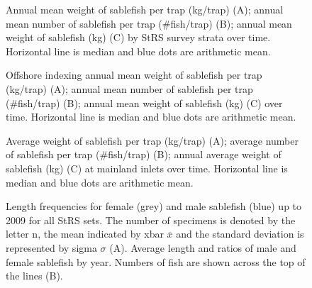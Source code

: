 \documentclass[12pt]{article}\usepackage[]{graphicx}\usepackage[]{color}
\begin{document}
\begin{figure}[htb]

{\centering {} 

}

\caption{Annual mean weight of sablefish per trap (kg/trap) (A); annual mean number of sablefish per trap (\#fish/trap) (B); annual mean weight of sablefish (kg) (C) by StRS survey strata over time. Horizontal line is median and blue dots are arithmetic mean.}\label{fig:figure10}
\end{figure}
\clearpage


\begin{figure}[htb]

{\centering {} 

}

\caption{Offshore indexing annual mean weight of sablefish per trap (kg/trap) (A); annual mean number of sablefish per trap (\#fish/trap) (B); annual mean weight of sablefish (kg) (C) over time. Horizontal line is median and blue dots are arithmetic mean.}\label{fig:figure11}
\end{figure}
\clearpage


\begin{figure}[htb]

{\centering {} 

}

\caption{Average weight of sablefish per trap (kg/trap) (A); average number of sablefish per trap (\#fish/trap) (B); annual average weight of sablefish (kg) (C) at mainland inlets over time. Horizontal line is median and blue dots are arithmetic mean.}\label{fig:figure12}
\end{figure}
\clearpage


\begin{figure}[htb]

{\centering {} 

}

\caption{Length frequencies for female (grey) and male sablefish (blue) up to 2009 for all StRS sets. The number of specimens is denoted by the letter n, the mean indicated by xbar \(\overline{x}\) and the standard deviation is represented by sigma \(\sigma\) (A). Average length and ratios of male and female sablefish by year. Numbers of fish are shown across the top of the lines (B).}\label{fig:figure13}
\end{figure}
\clearpage
\end{document}
